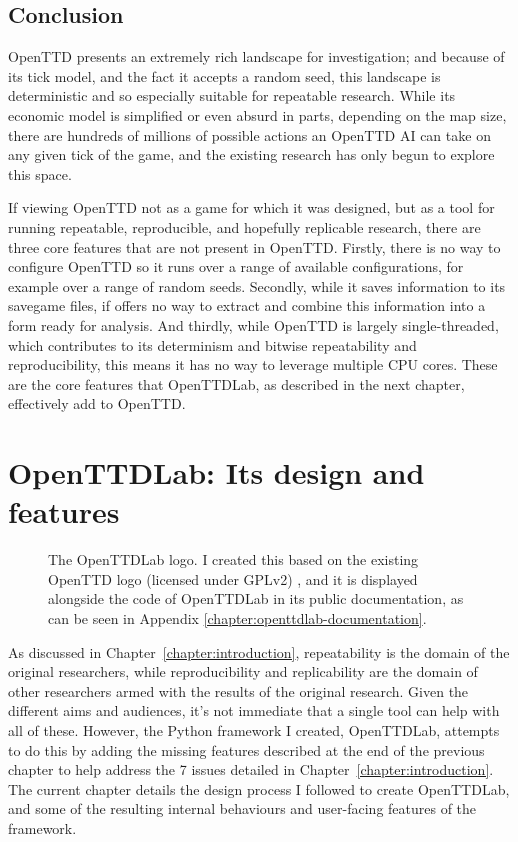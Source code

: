 \documentclass[logo,msc,dsti]{style/infthesis}    %
\begin{document}
{\section{Conclusion}

OpenTTD presents an extremely rich landscape for investigation; and because of its tick model, and the fact it accepts a random seed, this landscape is deterministic and so especially suitable for repeatable research. While its economic model is simplified or even absurd in parts, depending on the map size, there are hundreds of millions of possible actions an OpenTTD AI can take on any given tick of the game, and the existing research has only begun to explore this space.

If viewing OpenTTD not as a game for which it was designed, but as a tool for running repeatable, reproducible, and hopefully replicable research, there are three core features that are not present in OpenTTD. Firstly, there is no way to configure OpenTTD so it runs over a range of available configurations, for example over a range of random seeds. Secondly, while it saves information to its savegame files, if offers no way to extract and combine this information into a form ready for analysis. And thirdly, while OpenTTD is largely single-threaded, which contributes to its determinism and bitwise repeatability and reproducibility, this means it has no way to leverage multiple CPU cores. These are the core features that OpenTTDLab, as described in the next chapter, effectively add to OpenTTD.

\chapter{OpenTTDLab: Its design and features}
\label{chapter:openttdlab-design-process-and-features}

\begin{figure}[H]
\centering

\caption{The OpenTTDLab logo. I created this based on the existing OpenTTD logo (licensed under GPLv2) \cite{OpenTTDLogo}, and it is displayed alongside the code of OpenTTDLab in its public documentation, as can be seen in Appendix \ref{chapter:openttdlab-documentation}.}
\label{fig:openttlab-logo}
\end{figure}

As discussed in Chapter~\ref{chapter:introduction}, repeatability is the domain of the original researchers, while reproducibility and replicability are the domain of other researchers armed with the results of the original research. Given the different aims and audiences, it's not immediate that a single tool can help with all of these. However, the Python framework I created, OpenTTDLab, attempts to do this by adding the missing features described at the end of the previous chapter to help address the 7 issues detailed in Chapter~\ref{chapter:introduction}. The current chapter details the design process I followed to create OpenTTDLab, and some of the resulting internal behaviours and user-facing features of the framework.

}
\end{document}

